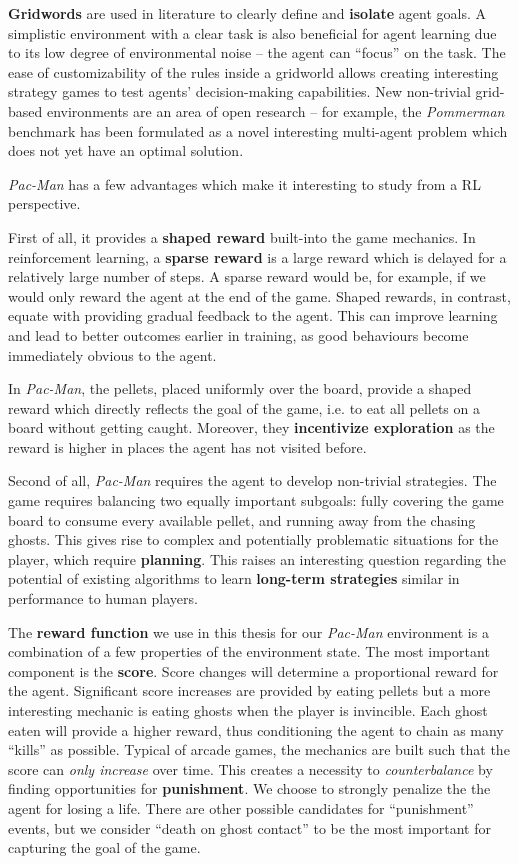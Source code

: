 \textbf{Gridwords} are used in literature to clearly define and \textbf{isolate} agent goals.
A simplistic environment with a clear task is also beneficial for agent learning due to its low degree of environmental noise -- the agent can ``focus'' on the task.
The ease of customizability of the rules inside a gridworld allows creating interesting strategy games to test agents’ decision-making capabilities.
New non-trivial grid-based environments are an area of open research -- for example, the \emph{Pommerman} benchmark \cite{pommerman-paper} has been formulated as a novel interesting multi-agent problem which does not yet have an optimal solution.

\emph{Pac-Man} has a few advantages which make it interesting to study from a RL perspective.

First of all, it provides a \textbf{shaped reward} built-into the game mechanics.
In reinforcement learning, a \textbf{sparse reward} is a large reward which is delayed for a relatively large number of steps.
A sparse reward would be, for example, if we would only reward the agent at the end of the game.
Shaped rewards, in contrast, equate with providing gradual feedback to the agent.
This can improve learning and lead to better outcomes earlier in training, as good behaviours become immediately obvious to the agent.

In \emph{Pac-Man}, the pellets, placed uniformly over the board, provide a shaped reward which directly reflects the goal of the game, i.e. to eat all pellets on a board without getting caught.
Moreover, they \textbf{incentivize exploration} as the reward is higher in places the agent has not visited before.

Second of all, \emph{Pac-Man} requires the agent to develop non-trivial strategies.
The game requires balancing two equally important subgoals: fully covering the game board to consume every available pellet, and running away from the chasing ghosts.
This gives rise to complex and potentially problematic situations for the player, which require \textbf{planning}.
This raises an interesting question regarding the potential of existing algorithms to learn \textbf{long-term strategies} similar in performance to human players.

The \textbf{reward function} we use in this thesis for our \emph{Pac-Man} environment is a combination of a few properties of the environment state.
The most important component is the \textbf{score}.
Score changes will determine a proportional reward for the agent.
Significant score increases are provided by eating pellets but a more interesting mechanic is eating ghosts when the player is invincible.
Each ghost eaten will provide a higher reward, thus conditioning the agent to chain as many ``kills'' as possible.
Typical of arcade games, the mechanics are built such that the score can \emph{only increase} over time.
This creates a necessity to \emph{counterbalance} by finding opportunities for \textbf{punishment}.
We choose to strongly penalize the the agent for losing a life.
There are other possible candidates for ``punishment'' events, but we consider ``death on ghost contact'' to be the most important for capturing the goal of the game.

